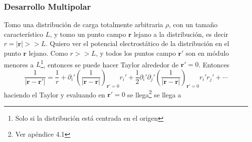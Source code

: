 

\subsubsection{Desarrollo Multipolar}
Tomo una distribución de carga totalmente arbitraria $\rho$, con un tamaño característico $L$, y tomo un punto campo $\textbf{r}$ lejano a la distribución, es decir $r = |\textbf{r}| >> L $. Quiero ver el potencial electrostático de la distribución en el punto $\textbf{r}$ lejano. Como $r >> L$, y todos los puntos campo $\textbf{r}'$ son en módulo menores a $L$\footnote{Solo si la distribución está centrada en el origen}, entonces se puede hacer Taylor alrededor de $\textbf{r}' = 0$. Entonces
\begin{equation*}
    \frac{1}{|\textbf{r}-\textbf{r}'|}
    =
    \frac{1}{r} 
    + \partial_{i}'
        \left(
            \frac{1}{|\textbf{r}-\textbf{r}|}
        \right)_{\textbf{r}' = 0}r_{i}'
    + \frac{1}{2} \partial_{i}'\partial_{j}'
        \left(
            \frac{1}{|\textbf{r}-\textbf{r}|}
        \right)_{\textbf{r}' = 0}r_{i}'r_{j}'
    +
    \cdots
\end{equation*}
haciendo el Taylor y evaluando en $\textbf{r}' = 0$ se llega\footnote{Ver apéndice 4.1} se llega a 

